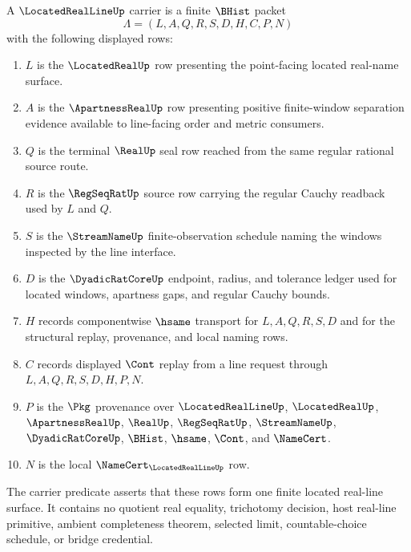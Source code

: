 \begin{definition}
\label{def:located-real-line-carrier}
A $\LocatedRealLineUp$ carrier is a finite $\BHist$ packet
$$
\Lambda=(L,A,Q,R,S,D,H,C,P,N)
$$
with the following displayed rows:
\begin{enumerate}
\item $L$ is the $\LocatedRealUp$ row presenting the point-facing located real-name surface.
\item $A$ is the $\ApartnessRealUp$ row presenting positive finite-window separation evidence available to line-facing order and metric consumers.
\item $Q$ is the terminal $\RealUp$ seal row reached from the same regular rational source route.
\item $R$ is the $\RegSeqRatUp$ source row carrying the regular Cauchy readback used by $L$ and $Q$.
\item $S$ is the $\StreamNameUp$ finite-observation schedule naming the windows inspected by the line interface.
\item $D$ is the $\DyadicRatCoreUp$ endpoint, radius, and tolerance ledger used for located windows, apartness gaps, and regular Cauchy bounds.
\item $H$ records componentwise $\hsame$ transport for $L,A,Q,R,S,D$ and for the structural replay, provenance, and local naming rows.
\item $C$ records displayed $\Cont$ replay from a line request through $L,A,Q,R,S,D,H,P,N$.
\item $P$ is the $\Pkg$ provenance over $\LocatedRealLineUp$, $\LocatedRealUp$, $\ApartnessRealUp$, $\RealUp$, $\RegSeqRatUp$, $\StreamNameUp$, $\DyadicRatCoreUp$, $\BHist$, $\hsame$, $\Cont$, and $\NameCert$.
\item $N$ is the local $\NameCert_{\LocatedRealLineUp}$ row.
\end{enumerate}
The carrier predicate asserts that these rows form one finite located real-line surface. It contains no quotient real equality, trichotomy decision, host real-line primitive, ambient completeness theorem, selected limit, countable-choice schedule, or bridge credential.
\end{definition}

